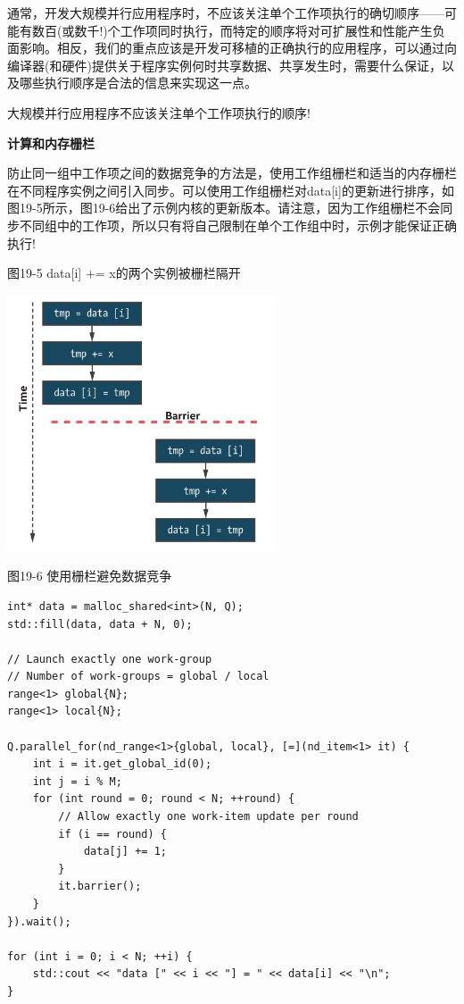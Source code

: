 通常，开发大规模并行应用程序时，不应该关注单个工作项执行的确切顺序——可能有数百(或数千!)个工作项同时执行，而特定的顺序将对可扩展性和性能产生负面影响。相反，我们的重点应该是开发可移植的正确执行的应用程序，可以通过向编译器(和硬件)提供关于程序实例何时共享数据、共享发生时，需要什么保证，以及哪些执行顺序是合法的信息来实现这一点。\par

\begin{tcolorbox}[colback=red!5!white,colframe=red!75!black]
大规模并行应用程序不应该关注单个工作项执行的顺序!
\end{tcolorbox}

\hspace*{\fill} \par %
\textbf{计算和内存栅栏}

防止同一组中工作项之间的数据竞争的方法是，使用工作组栅栏和适当的内存栅栏在不同程序实例之间引入同步。可以使用工作组栅栏对data[i]的更新进行排序，如图19-5所示，图19-6给出了示例内核的更新版本。请注意，因为工作组栅栏不会同步不同组中的工作项，所以只有将自己限制在单个工作组中时，示例才能保证正确执行!\par

\hspace*{\fill} \par %
图19-5 data[i] += x的两个实例被栅栏隔开
\begin{center}
	\includegraphics[width=0.6\textwidth]{content/chapter-19/images/4}
\end{center}

\hspace*{\fill} \par %
图19-6 使用栅栏避免数据竞争
\begin{lstlisting}[caption={}]
int* data = malloc_shared<int>(N, Q);
std::fill(data, data + N, 0);

// Launch exactly one work-group
// Number of work-groups = global / local
range<1> global{N};
range<1> local{N};

Q.parallel_for(nd_range<1>{global, local}, [=](nd_item<1> it) {
	int i = it.get_global_id(0);
	int j = i % M;
	for (int round = 0; round < N; ++round) {
		// Allow exactly one work-item update per round
		if (i == round) {
			data[j] += 1;
		}
		it.barrier();
	}
}).wait();

for (int i = 0; i < N; ++i) {
	std::cout << "data [" << i << "] = " << data[i] << "\n";
}
\end{lstlisting}

